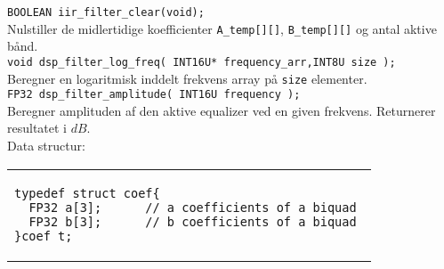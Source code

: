 \texttt{BOOLEAN iir\_filter\_clear(void);} \\ 
Nulstiller de midlertidige koefficienter \texttt{A\_temp[][]}, \texttt{B\_temp[][]} og antal aktive bånd. \\

\texttt{void dsp\_filter\_log\_freq( INT16U* frequency\_arr,INT8U size );} \\ 
Beregner en logaritmisk inddelt frekvens array på \texttt{size} elementer. \\

\texttt{FP32 dsp\_filter\_amplitude( INT16U frequency );}\\
Beregner amplituden af den aktive equalizer ved en given frekvens. Returnerer resultatet i $dB$. \\

Data structur:\\
\begin{tabular}{l}
\begin{lstlisting}
typedef struct coef{
  FP32 a[3];      // a coefficients of a biquad
  FP32 b[3];      // b coefficients of a biquad 
}coef_t;
\end{lstlisting}
\end{tabular}









